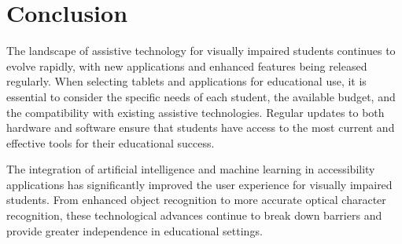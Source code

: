 \section{Conclusion}
\label{sec:conclusion-tablets}
The landscape of assistive technology for visually impaired students continues to evolve rapidly, with new applications and enhanced features being released regularly. When selecting tablets and applications for educational use, it is essential to consider the specific needs of each student, the available budget, and the compatibility with existing assistive technologies. Regular updates to both hardware and software ensure that students have access to the most current and effective tools for their educational success.

The integration of artificial intelligence and machine learning in accessibility applications has significantly improved the user experience for visually impaired students. From enhanced object recognition to more accurate optical character recognition, these technological advances continue to break down barriers and provide greater independence in educational settings.
